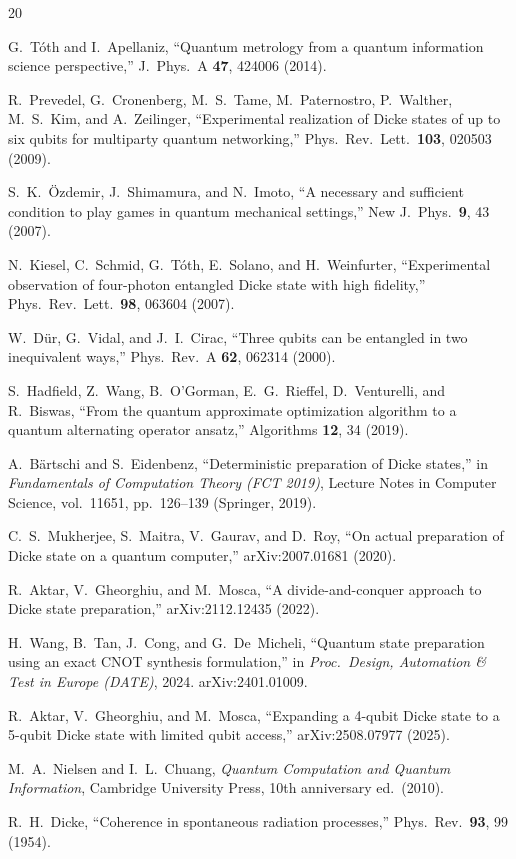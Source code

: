 \documentclass[twocolumn,10pt]{article}
\begin{document}

\begin{thebibliography}{20}

G.~T\'oth and I.~Apellaniz,
``Quantum metrology from a quantum information science perspective,''
J.\ Phys.\ A \textbf{47}, 424006 (2014).

R.~Prevedel, G.~Cronenberg, M.~S.~Tame, M.~Paternostro, P.~Walther,
M.~S.~Kim, and A.~Zeilinger,
``Experimental realization of Dicke states of up to six qubits for multiparty
quantum networking,''
Phys.\ Rev.\ Lett.\ \textbf{103}, 020503 (2009).

S.~K.~\"Ozdemir, J.~Shimamura, and N.~Imoto,
``A necessary and sufficient condition to play games in quantum mechanical
settings,''
New J.\ Phys.\ \textbf{9}, 43 (2007).

N.~Kiesel, C.~Schmid, G.~T\'oth, E.~Solano, and H.~Weinfurter,
``Experimental observation of four-photon entangled Dicke state with high
fidelity,''
Phys.\ Rev.\ Lett.\ \textbf{98}, 063604 (2007).

W.~D\"ur, G.~Vidal, and J.~I.~Cirac,
``Three qubits can be entangled in two inequivalent ways,''
Phys.\ Rev.\ A \textbf{62}, 062314 (2000).

S.~Hadfield, Z.~Wang, B.~O'Gorman, E.~G.~Rieffel, D.~Venturelli, and
R.~Biswas,
``From the quantum approximate optimization algorithm to a quantum alternating
operator ansatz,''
Algorithms \textbf{12}, 34 (2019).

A.~B\"artschi and S.~Eidenbenz,
``Deterministic preparation of Dicke states,''
in \textit{Fundamentals of Computation Theory (FCT 2019)}, Lecture Notes in
Computer Science, vol.\ 11651, pp.\ 126--139 (Springer, 2019).

C.~S.~Mukherjee, S.~Maitra, V.~Gaurav, and D.~Roy,
``On actual preparation of Dicke state on a quantum computer,''
arXiv:2007.01681 (2020).

R.~Aktar, V.~Gheorghiu, and M.~Mosca,
``A divide-and-conquer approach to Dicke state preparation,''
arXiv:2112.12435 (2022).

H.~Wang, B.~Tan, J.~Cong, and G.~De~Micheli,
``Quantum state preparation using an exact CNOT synthesis formulation,''
in \textit{Proc.\ Design, Automation \& Test in Europe (DATE)}, 2024.
arXiv:2401.01009.

R.~Aktar, V.~Gheorghiu, and M.~Mosca,
``Expanding a 4-qubit Dicke state to a 5-qubit Dicke state with limited
qubit access,''
arXiv:2508.07977 (2025).

M.~A.~Nielsen and I.~L.~Chuang,
\textit{Quantum Computation and Quantum Information},
Cambridge University Press, 10th anniversary ed.\ (2010).

R.~H.~Dicke,
``Coherence in spontaneous radiation processes,''
Phys.\ Rev.\ \textbf{93}, 99 (1954).

\end{thebibliography}
\end{document}
